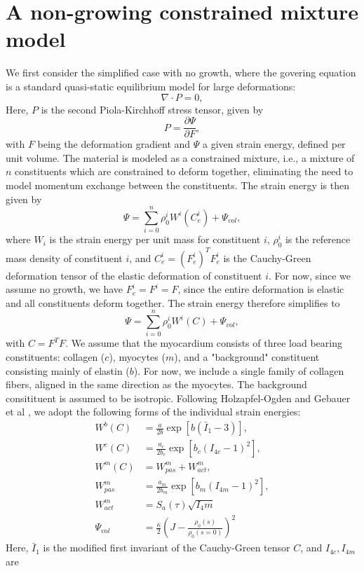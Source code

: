 \documentclass[twoside,12pt,a4paper]{article}
\begin{document}
\section{A non-growing constrained mixture model}
We first consider the simplified case with no growth, where the govering equation is 
a standard quasi-static equilibrium model for large deformations:
\[
\nabla\cdot P = 0,  
\]
Here, $P$ is the second Piola-Kirchhoff stress tensor, given by 
\[
P = \frac{\partial \Psi}{\partial F},  
\]
with $F$ being the deformation gradient and $\Psi$ a given strain energy, defined per unit volume. The material is modeled as a constrained mixture, i.e., a 
mixture of $n$ constituents which are constrained to deform together, eliminating the need to model
momentum exchange between the constituents. The strain energy is then given by
\[
\Psi = \sum_{i=0}^n \rho_0^i W^i(C_e^i) + \Psi_{vol} , 
\]
where $W_i$ is the strain energy per unit mass for constituent $i$, $\rho_0^i$ is the
reference mass density of constituent $i$, and $C_e^i = (F_e^i)^TF_e^i$ is the Cauchy-Green
deformation tensor of the elastic deformation of constituent $i$. For now, since we
assume no growth, we have $F_e^i = F^i = F$, since the entire deformation is elastic and
all constituents deform together. The strain energy therefore simplifies to 
\[
\Psi = \sum_{i=0}^n \rho_0^i W^i(C) + \Psi_{vol} , 
\]
with $C = F^T F$. We assume that the myocardium consists of three load bearing constituents: 
collagen ($c$), myocytes ($m$), and a "background" constituent consisting mainly of elastin ($b$).
For now, we include a single family of collagen fibers, aligned in the same direction as the
myocytes. The background consitituent is assumed to be isotropic. Following 
Holzapfel-Ogden \cite{holzapfel2009constitutive}and
Gebauer et al \cite{gebauer2022homogenized}, we adopt the following forms of the individual strain energies:
\begin{align*}
  W^b(C) &= \frac{a}{2b}\exp[b (\bar{I}_1 -3)],  \\
  W^c(C)  &= \frac{a_c}{2b_c}\exp[b_c (I_{4c} -1)^2], \\
  W^m(C) &= W_{pas}^m + W_{act}^m, \\
  W_{pas}^m &= \frac{a_m}{2b_m}\exp[b_m (I_{4m} -1)^2], \\ 
  W_{act}^m &= S_a(\tau) \sqrt{I_4m} \\
  \Psi_{vol} &= \frac{\kappa}{2}\left(J -\frac{\rho_0(s)}{\rho_0(s=0)} \right)^2
\end{align*}
Here, $\bar{I}_1$ is the modified first invariant of the Cauchy-Green tensor $C$, and $I_{4c},I_{4m}$ are
\end{document}
